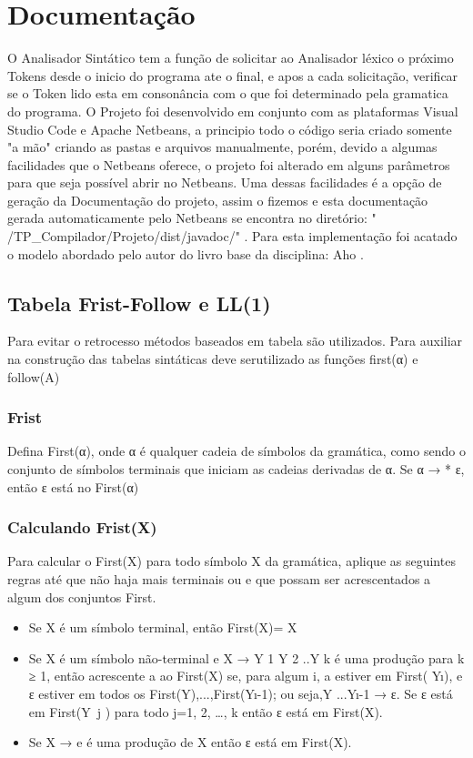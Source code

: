 \chapter{Documentação}
O Analisador Sintático tem a função de solicitar ao Analisador léxico o próximo Tokens desde o inicio do programa ate o final, e apos a cada solicitação, verificar se o Token lido esta em consonância com o que foi determinado pela gramatica do programa.
\newline
O Projeto foi desenvolvido em conjunto com as plataformas Visual Studio Code e Apache Netbeans, a principio todo o código seria criado somente "a mão" criando as pastas e arquivos manualmente, porém, devido a algumas facilidades que o Netbeans  oferece, o projeto foi alterado em alguns parâmetros para que seja possível abrir no Netbeans.
Uma dessas facilidades é a opção de geração da Documentação do projeto, assim o fizemos e esta documentação gerada automaticamente pelo Netbeans se encontra no diretório: " /TP{\_}Compilador/Projeto/dist/javadoc/" . Para esta implementação foi acatado o modelo abordado pelo autor do livro base da disciplina: Aho .
\section{Tabela Frist-Follow e LL(1)}

Para evitar o retrocesso métodos baseados em 
tabela são utilizados. Para auxiliar na construção 
das tabelas sintáticas deve serutilizado as funções first(α)
e follow(A)
\subsection{Frist}

Defina First(α), onde α é qualquer cadeia de 
símbolos da gramática, como sendo o conjunto 
de símbolos terminais que iniciam as cadeias 
derivadas de α. Se α → * ε, então ε está no 
First(α)
\subsection{Calculando Frist(X)}

Para calcular o First(X) para todo símbolo X da 
gramática, aplique as seguintes regras até que não haja 
mais terminais ou e que possam ser acrescentados a 
algum dos conjuntos First.


\begin{itemize}
    \item 
       Se X é um símbolo terminal, então First(X)= {X}
    \item
        Se X é um símbolo não-terminal e X → Y
1
Y
2
..Y
k
 é 
uma produção para k ≥ 1, então acrescente a ao 
First(X) se, para algum i, a  estiver em First( Y\i ), e ε
estiver em todos os First(Y\1),...,First(Y\i-1); ou seja,Y\1
...Y\i-1 → ε. Se ε está em First(Y\ j ) para todo j=1, 2, …, k então ε está em First(X).

    \item
       Se X → e é uma produção de X então ε está em  First(X).
    
   \end{itemize}
